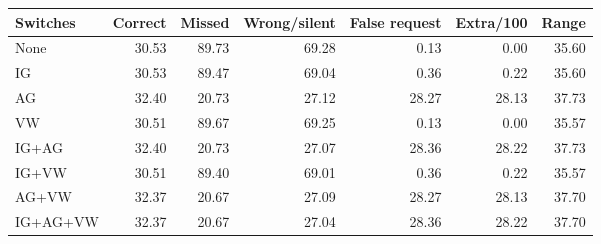 \begin{tabular}{@{}lrrrrrr@{}}
\toprule
Switches & Correct & Missed & Wrong/silent & False request & Extra/100 & Range \\
\midrule
None & 30.53 & 89.73 & 69.28 & 0.13 & 0.00 & 35.60 \\
IG & 30.53 & 89.47 & 69.04 & 0.36 & 0.22 & 35.60 \\
AG & 32.40 & 20.73 & 27.12 & 28.27 & 28.13 & 37.73 \\
VW & 30.51 & 89.67 & 69.25 & 0.13 & 0.00 & 35.57 \\
IG+AG & 32.40 & 20.73 & 27.07 & 28.36 & 28.22 & 37.73 \\
IG+VW & 30.51 & 89.40 & 69.01 & 0.36 & 0.22 & 35.57 \\
AG+VW & 32.37 & 20.67 & 27.09 & 28.27 & 28.13 & 37.70 \\
IG+AG+VW & 32.37 & 20.67 & 27.04 & 28.36 & 28.22 & 37.70 \\
\bottomrule
\end{tabular}
